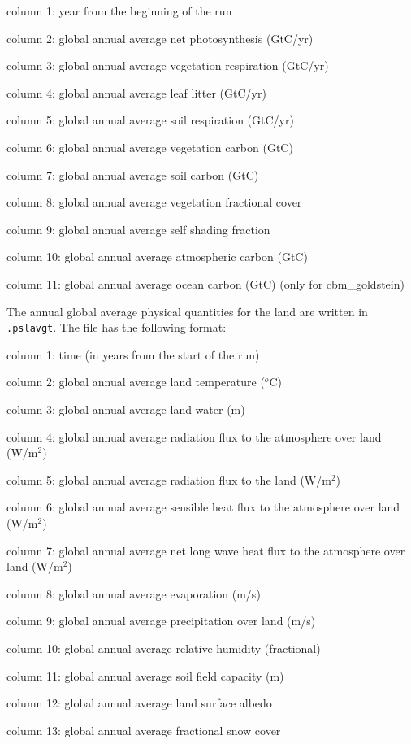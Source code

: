 \documentclass[10pt,a4paper]{report}
\begin{document}
column 1: year from the beginning of the run

column 2: global annual average net photosynthesis (GtC/yr)

column 3: global annual average vegetation respiration (GtC/yr)

column 4: global annual average leaf litter (GtC/yr)

column 5: global annual average soil respiration (GtC/yr)

column 6: global annual average vegetation carbon (GtC)

column 7: global annual average soil carbon (GtC)

column 8: global annual average vegetation fractional cover

column 9: global annual average self shading fraction

column 10: global annual average atmospheric carbon (GtC)

column 11: global annual average ocean carbon (GtC) (only for
cbm\_goldstein)

The annual global average physical quantities for the land are
written in {\tt .pslavgt}. The file has the following format:

column 1: time (in years from the start of the run)

column 2: global annual average land temperature ($^o$C)

column 3: global annual average land water (m)

column 4: global annual average radiation flux to the atmosphere
over land (W/m$^2$)

column 5: global annual average radiation flux to the land (W/m$^2$)

column 6: global annual average sensible heat flux to the atmosphere
over land (W/m$^2$)

column 7: global annual average net long wave heat flux to the
atmosphere over land (W/m$^2$)

column 8: global annual average evaporation (m/s)

column 9: global annual average precipitation over land (m/s)

column 10: global annual average relative humidity (fractional)

column 11: global annual average soil field capacity (m)

column 12: global annual average land surface albedo

column 13: global annual average fractional snow cover
\end{document}
